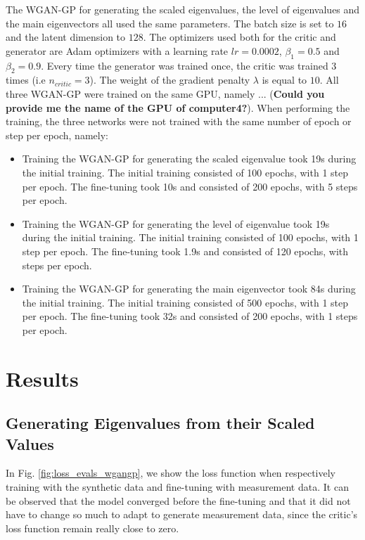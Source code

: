 \documentclass[11pt,a4paper,twoside]{report}
\begin{document}
The WGAN-GP for generating the scaled eigenvalues, the level of eigenvalues and the main eigenvectors all used the same parameters. The batch size is set to $16$ and the latent dimension to $128$. The optimizers used both for the critic and generator are Adam optimizers with a learning rate $lr=0.0002$, $\beta_1=0.5$ and $\beta_2=0.9$. Every time the generator was trained once, the critic was trained 3 times (i.e $n_{critic} = 3$). The weight of the gradient penalty $\lambda$ is equal to $10$. All three WGAN-GP were trained on the same GPU, namely ...  
(\textbf{Could you provide me the name of the GPU of computer4?}). When performing the training, the three networks were not trained with the same number of epoch or step per epoch, namely:

\begin{itemize}
    \item Training the WGAN-GP for generating the scaled eigenvalue took 19s during the initial training. The initial training consisted of 100 epochs, with 1 step per epoch. The fine-tuning took 10s and consisted of 200 epochs, with 5 steps per epoch.
    \item Training the WGAN-GP for generating the level of eigenvalue took 19s during the initial training. The initial training consisted of 100 epochs, with 1 step per epoch. The fine-tuning took 1.9s and consisted of 120 epochs, with  steps per epoch.
    \item Training the WGAN-GP for generating the main eigenvector took 84s during the initial training. The initial training consisted of 500 epochs, with 1 step per epoch. The fine-tuning took 32s and consisted of 200 epochs, with 1 steps per epoch.
\end{itemize}

\chapter{Results}

\section{Generating Eigenvalues from their Scaled Values}

In Fig. \ref{fig:loss_evals_wgangp}, we show the loss function when respectively training with the synthetic data and fine-tuning with measurement data. It can be observed that the model converged before the fine-tuning and that it did not have to change so much to adapt to generate measurement data, since the critic's loss function remain really close to zero.
\end{document}
